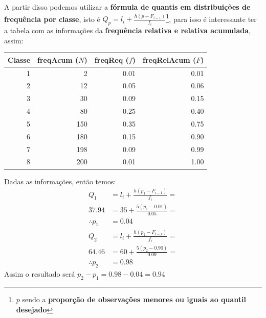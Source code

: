 \begin{parts}
\begin{solution}
        A partir disso podemos utilizar a \textbf{fórmula de quantis em distribuições de frequência por classe}, isto é $Q_p = l_i + \frac{h(p - F_{i - 1})}{f_i}$\footnote{$p$ sendo a \textbf{proporção de observações menores ou iguais ao quantil desejado}}, para isso é interessante ter a tabela com as informações da \textbf{frequência relativa e relativa acumulada}, assim:

        \begin{table}[H]
            \centering
            \begin{tabular}{rrrr}
                \hline
                Classe & freqAcum ($N$) & freqReq ($f$) & freqRelAcum ($F$) \\
                \hline
                1      & 2              & 0.01          & 0.01              \\
                2      & 12             & 0.05          & 0.06              \\
                3      & 30             & 0.09          & 0.15              \\
                4      & 80             & 0.25          & 0.40              \\
                5      & 150            & 0.35          & 0.75              \\
                6      & 180            & 0.15          & 0.90              \\
                7      & 198            & 0.09          & 0.99              \\
                8      & 200            & 0.01          & 1.00              \\
                \hline
            \end{tabular}
        \end{table}

        Dadas as informações, então temos:
        \begin{equation*}
            \begin{split}
                Q_1            & = l_i + \frac{h(p_1 - F_{i-1})}{f_i} = \\
                37.94          & = 35 + \frac{5(p_1 - 0.01)}{0.05} =    \\
                \therefore p_1 & = 0.04
            \end{split}
        \end{equation*}
        \begin{equation*}
            \begin{split}
                Q_2            & = l_i + \frac{h(p_2 - F_{i-1})}{f_i} = \\
                64.46          & = 60 + \frac{5(p_2 - 0.90)}{0.09} =    \\
                \therefore p_2 & = 0.98
            \end{split}
        \end{equation*}
        Assim o resultado será $p_2 - p_1 = 0.98 - 0.04 = 0.94$
    \end{solution}
    \ifprintanswers
        \spewnotes
    \fi


\end{parts}
